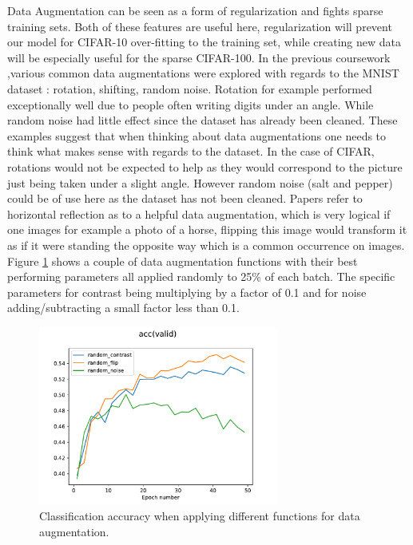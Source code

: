 \documentclass[12pt]{article}
\begin{document}
Data Augmentation can be seen as a form of regularization and fights sparse training sets. Both of these features are useful here, regularization will prevent our model for CIFAR-10 over-fitting to the training set, while creating new data will be especially useful for the sparse CIFAR-100. In the previous coursework ,various common data augmentations were explored with regards to the MNIST dataset : rotation, shifting, random noise. Rotation for example performed exceptionally well due to people often writing digits under an angle. While random noise had little effect since the dataset has already been cleaned. These examples suggest that when thinking about data augmentations one needs to think what makes sense with regards to the dataset. In the case of CIFAR, rotations would not be expected to help as they would correspond to the picture just being taken under a slight angle. However random noise\cite{grey2} (salt and pepper) could be of use here as the dataset has not been cleaned. Papers\cite{Flip} refer to horizontal reflection as to a helpful data augmentation, which is very logical if one images for example a photo of a horse, flipping this image would transform it as if it were standing the opposite way which is a common occurrence on images. Figure \ref{fig:aug} shows a couple of data augmentation functions with their best performing parameters all applied randomly to 25\% of each batch. The specific parameters for contrast being multiplying by a factor of 0.1 and for noise adding/subtracting a small factor less than 0.1. 


\begin{figure}[H]
\centering
\includegraphics[width=0.7\textwidth]{augmentation.pdf}

  \caption{Classification accuracy when applying different functions for data augmentation.}
  \label{fig:aug}
\end{figure}
\end{document}
